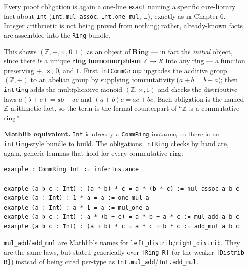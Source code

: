 Every proof obligation is again a one-line \texttt{exact} naming a specific core-library fact about \texttt{Int} (\texttt{Int.mul\_\allowbreak{}assoc}, \texttt{Int.one\_\allowbreak{}mul}, \ldots), exactly as in Chapter 6. Integer arithmetic is not being proved from nothing; rather, already-known facts are assembled into the \texttt{Ring} bundle.

\begin{mathreading}

This shows \((\mathbb{Z}, +, \times, 0, 1)\) as an object of \(\mathbf{Ring}\) --- in fact the \hyperref[sec:01-basics:04-terminology:1]{\emph{initial} object}, since there is a unique \textbf{ring homomorphism} \(\mathbb{Z} \to R\) into any ring --- a function preserving \(+\), \(\times\), \(0\), and \(1\). First \texttt{intCommGroup} upgrades the additive group \((\mathbb{Z},+)\) to an abelian group by supplying commutativity (\(a + b = b + a\)); then \texttt{intRing} adds the multiplicative monoid \((\mathbb{Z}, \times, 1)\) and checks the distributive laws \(a(b+c) = ab + ac\) and \((a+b)c = ac + bc\). Each obligation is the named \(\mathbb{Z}\)-arithmetic fact, so the term is the formal counterpart of ``\(\mathbb{Z}\) is a commutative ring.''

\end{mathreading}

\textbf{Mathlib equivalent.} \texttt{Int} is already a \href{https://loogle.lean-lang.org/?q=CommRing}{\texttt{CommRing}} instance, so there is no \texttt{intRing}-style bundle to build. The obligations \texttt{intRing} checks by hand are, again, generic lemmas that hold for every commutative ring:

\begin{lstlisting}
example : CommRing Int := inferInstance

example (a b c : Int) : (a * b) * c = a * (b * c) := mul_assoc a b c
example (a : Int) : 1 * a = a := one_mul a
example (a : Int) : a * 1 = a := mul_one a
example (a b c : Int) : a * (b + c) = a * b + a * c := mul_add a b c
example (a b c : Int) : (a + b) * c = a * c + b * c := add_mul a b c
\end{lstlisting}

\href{https://loogle.lean-lang.org/?q=mul_add}{\texttt{mul\_\allowbreak{}add}}/\href{https://loogle.lean-lang.org/?q=add_mul}{\texttt{add\_\allowbreak{}mul}} are Mathlib's names for \texttt{left\_\allowbreak{}distrib}/\texttt{right\_\allowbreak{}distrib}. They are the same laws, but stated generically over \texttt{[Ring R]} (or the weaker \texttt{[Distrib R]}) instead of being cited per-type as \texttt{Int.mul\_\allowbreak{}add}/\texttt{Int.add\_\allowbreak{}mul}.

